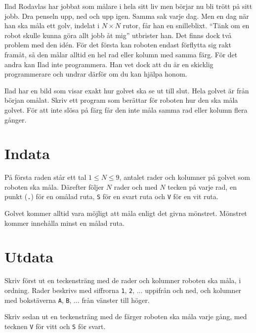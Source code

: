 Ilad Rodavlas har jobbat som målare i hela sitt liv men börjar nu bli trött på sitt jobb.
Dra penseln upp, ned och upp igen.
Samma sak varje dag.
Men en dag när han ska måla ett golv, indelat i $N \times N$ rutor, får han en snilleblixt.
``Tänk om en robot skulle kunna göra allt jobb åt mig'' utbrister han.
Det finns dock två problem med den  idén.
För det första kan roboten endast förflytta sig rakt framåt, så den målar alltid en hel rad eller kolumn med samma färg.
För det andra kan Ilad inte programmera.
Han vet dock att du är en skicklig programmerare och undrar därför om du kan hjälpa honom. 

Ilad har en bild som visar exakt hur golvet ska se ut till slut.
Hela golvet är från början omålat.
Skriv ett program som berättar för roboten hur den ska måla golvet.
För att inte slösa på färg får den inte måla samma rad eller kolumn flera gånger.


\section*{Indata}
På första raden står ett tal $1 \leq N \leq 9$, antalet rader och kolumner på golvet som roboten ska måla.
Därefter följer $N$ rader och med $N$ tecken på varje rad, en punkt (\verb|.|) för en omålad ruta, \verb|S| för en svart ruta och \verb|V| för en vit ruta.

Golvet kommer alltid vara möjligt att måla enligt det givna mönstret. Mönstret kommer innehålla minst en målad ruta. 

\section*{Utdata}
Skriv först ut en teckensträng med de rader och kolumner roboten ska måla, i ordning.
Rader beskrivs med siffrorna \verb|1|, \verb|2|, $\dots$ uppifrån och ned, och kolumner med bokstäverna \verb|A|, \verb|B|, $\dots$ från vänster till höger.

Skriv sedan ut en teckensträng med de färger roboten ska måla varje gång, med tecknen \texttt{V} för vitt och \texttt{S} för svart.

